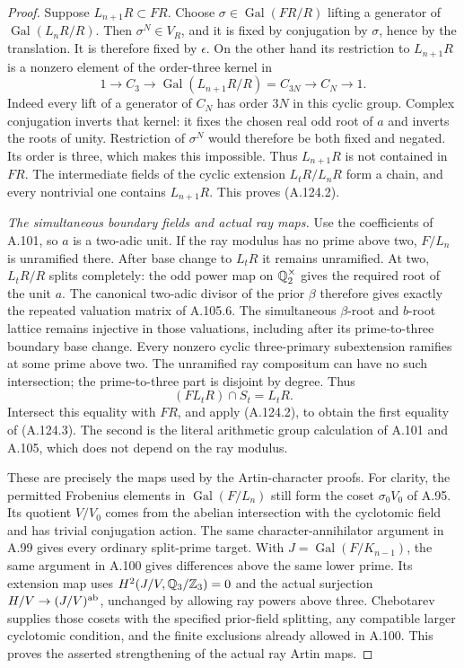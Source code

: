 \begin{proof}
Suppose \(L_{n+1}R\subset FR\).
Choose \(\sigma\in\operatorname{Gal}(FR/R)\)
lifting a generator of \(\operatorname{Gal}(L_nR/R)\).
Then \(\sigma^N\in V_R\), and it is fixed by
conjugation by \(\sigma\), hence by the translation.
It is therefore fixed by \(\epsilon\).
On the other hand its restriction to \(L_{n+1}R\)
is a nonzero element of the order-three kernel in
\[
 1\longrightarrow C_3\longrightarrow
           \operatorname{Gal}(L_{n+1}R/R)=C_{3N}
                \longrightarrow C_N\longrightarrow1.
 \tag{A.124.12}
\]
Indeed every lift of a generator of \(C_N\)
has order \(3N\) in this cyclic group.
Complex conjugation inverts that kernel:
it fixes the chosen real odd root of \(a\)
and inverts the roots of unity.
Restriction of \(\sigma^N\) would therefore
be both fixed and negated.
Its order is three, which makes this impossible.
Thus \(L_{n+1}R\) is not contained in \(FR\).
The intermediate fields of the cyclic extension
\(L_tR/L_nR\) form a chain, and every nontrivial
one contains \(L_{n+1}R\).
This proves (A.124.2).

\emph{The simultaneous boundary fields and actual ray maps.}
Use the coefficients of A.101, so \(a\) is
a two-adic unit.
If the ray modulus has no prime above two,
\(F/L_n\) is unramified there.
After base change to \(L_tR\) it remains unramified.
At two, \(L_tR/R\) splits completely: the odd
power map on \(\mathbb Q_2^\times\) gives the required
root of the unit \(a\).
The canonical two-adic divisor of the prior
\(\beta\) therefore gives exactly the repeated
valuation matrix of A.105.6.
The simultaneous \(\beta\)-root and \(b\)-root
lattice remains injective in those valuations,
including after its prime-to-three boundary
base change.
Every nonzero cyclic three-primary subextension
ramifies at some prime above two.
The unramified ray compositum can have no such
intersection; the prime-to-three part is disjoint
by degree.
Thus
\[
                   (FL_tR)\cap S_t=L_tR.
 \tag{A.124.13}
\]
Intersect this equality with \(FR\), and apply
(A.124.2), to obtain the first equality of
(A.124.3).
The second is the literal arithmetic group
calculation of A.101 and A.105, which does
not depend on the ray modulus.

These are precisely the maps used by the
Artin-character proofs.
For clarity, the permitted Frobenius elements
in \(\operatorname{Gal}(F/L_n)\) still form
the coset \(\sigma_0V_0\) of A.95.
Its quotient \(V/V_0\) comes from the abelian
intersection with the cyclotomic field and
has trivial conjugation action.
The same character-annihilator argument in
A.99 gives every ordinary split-prime target.
With \(J=\operatorname{Gal}(F/K_{n-1})\),
the same argument in A.100 gives differences
above the same lower prime.
Its extension map uses
\(H^2(J/V,\mathbb Q_3/\mathbb Z_3)=0\) and the actual
surjection \(H/V\to(J/V)^{\rm ab}\), unchanged
by allowing ray powers above three.
Chebotarev supplies those cosets with the
specified prior-field splitting, any compatible
larger cyclotomic condition, and the finite
exclusions already allowed in A.100.
This proves the asserted strengthening of
the actual ray Artin maps.


\end{proof}
